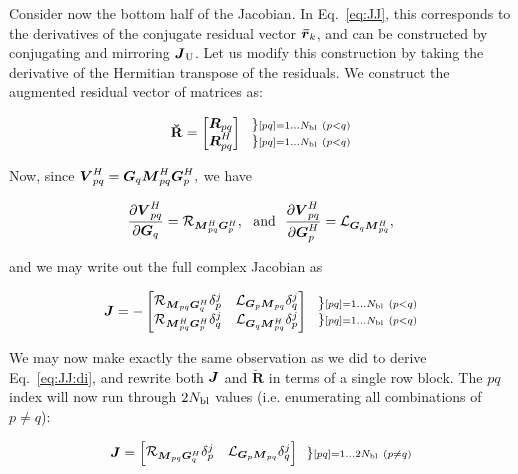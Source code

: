 \documentclass[useAMS,usenatbib]{mn2e}
\makeatletter
\newcommand{\rrc}{\bmath{\bar r}}
\newcommand{\mat}[1]{{\bmath{#1}}}
\newcommand{\JJ}{\mat{J}} %
\newcommand{\MM}{\mat{M}}
\newcommand{\RR}{\mat{R}}
\newcommand{\VV}{\mat{V}}
\newcommand{\GG}{\mat{G}}
\newcommand{\Matrix}[2]{\left [ \begin{array}{@{}#1@{}}#2\end{array} \right ]}
\newcommand{\Stack}[1]{\begin{array}{@{}c@{}}#1\end{array}}
\newcommand{\AUGx}[1]{\mathbf{\breve{#1}}}
\newcommand{\RRr}{\AUGx{R}}
\newcommand{\TOP}{\mathrm{U}}%
\newcommand{\Rop}[1]{\mathcal{R}_{{#1}}}
\newcommand{\Lop}[1]{\mathcal{L}_{{#1}}}
\makeatother
\begin{document}
Consider now the bottom half of the Jacobian. In Eq.~\ref{eq:JJ}, this corresponds to the derivatives of the conjugate residual
vector $\rrc_k$, and can be constructed by conjugating and mirroring $\JJ_\TOP$. Let us modify this construction 
by taking the derivative of the Hermitian transpose of the residuals. We construct the augmented residual vector of matrices
as:

\begin{equation}
\RRr = 
\Matrix{c}{
  \RR_{pq} \\ 
  \RR^H_{pq} 
} 
~~ 
\Stack{ 
\} \scriptstyle [pq]=1\dots \Nbl~(p<q) \\ 
\} \scriptstyle [pq]=1\dots \Nbl~(p<q) 
}
\label{eq:RRtranspose}
\end{equation}


Now, since $\VV^H_{pq}=\GG_q \MM^H_{pq} \GG^H_p,$ we have

\begin{equation}
\label{eq:dRH:dG}
\frac{\partial\VV^H_{pq}}{\partial\GG_q} = \Rop{\MM^H_{pq}\GG^H_p},\mathrm{~~and~~}
\frac{\partial\VV^H_{pq}}{\partial\GG^H_p} = \Lop{\GG_q \MM^H_{pq}},
\end{equation}

and we may write out the full complex Jacobian as

\[
\JJ = - \Matrix{cc}{ 
\Rop{ \MM_{pq}\GG^H_q }\delta^j_p & 
\Lop{ \GG_p \MM_{pq}  }\delta^j_q \\
\Rop{ \MM^H_{pq} \GG^H_p } \delta^j_q & 
\Lop{ \GG_q \MM^H_{pq}  } \delta^j_p  
}~~ 
\Stack{ 
\} \scriptstyle [pq]=1\dots \Nbl~(p<q) \\ 
\} \scriptstyle [pq]=1\dots \Nbl~(p<q) 
}
\]

We may now make exactly the same observation as we did to derive Eq.~\ref{eq:JJ:di}, and rewrite both $\JJ$ and $\RRr$ in terms of 
a single row block. The $pq$ index will now run through $2N_\mathrm{bl}$ values (i.e. enumerating all combinations of $p\ne q$):

\begin{equation}
\label{eq:JJ:pol}
\JJ = \Matrix{cc}{ 
\Rop{ \MM_{pq}\GG^H_q }\delta^j_p & 
\Lop{ \GG_p \MM_{pq}  }\delta^j_q \\
}~~ 
\} \scriptstyle [pq]=1\dots 2\Nbl~(p\ne q)\\ 
\end{equation}
\end{document}
